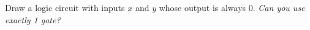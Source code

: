 \documentclass[12pt, oneside]{article}
\begin{document}
Draw a logic circuit with inputs $x$ and $y$ whose output  is always $0$.  {\it  Can you use exactly 1 gate?}


\vspace{40pt} \vfill
\newpage

\end{document}
